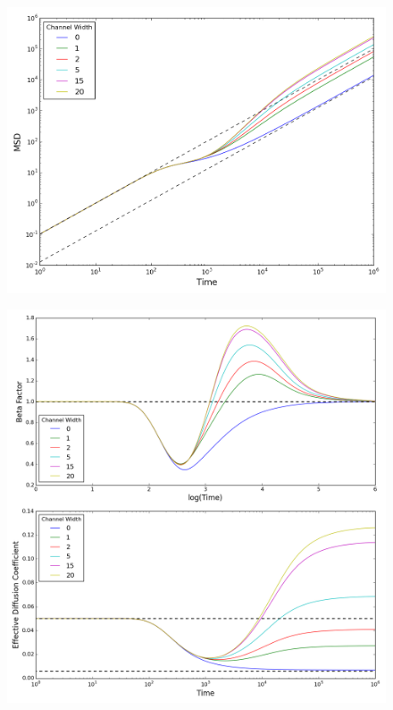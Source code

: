 	\begin{figure}[h]
		\centering
		\includegraphics[width=1.0\linewidth]{../images/2D/ye_msd_2D}
		\caption{}
		\label{fig:ye_msd_2D}
	\end{figure}
	
	\begin{figure}[h]
		\centering
		\includegraphics[width=1.0\linewidth]{../images/2D/ye_beta_deff_2D}
		\caption{}
		\label{fig:ye_beta_deff_2D}
	\end{figure}

	